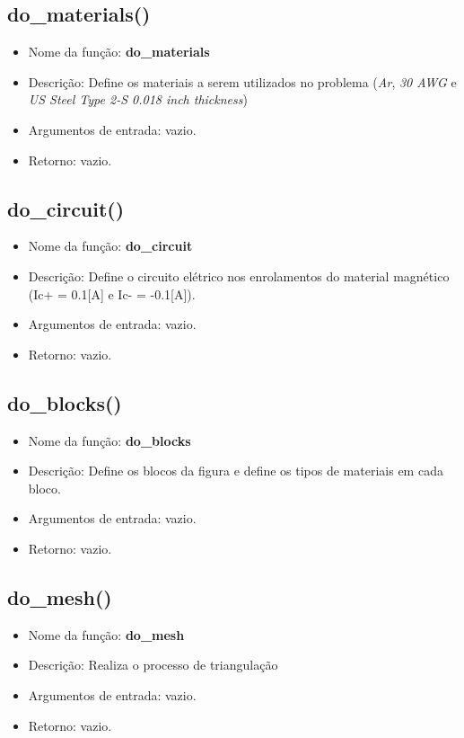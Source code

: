 \subsection*{do\_materials()}
\begin{itemize}
  \item Nome da função: \textbf{do\_materials}
  \item Descrição: Define os materiais a serem utilizados no problema (\textit{Ar}, \textit{30 AWG} e \textit{US Steel Type 2-S 0.018 inch thickness})
  \item Argumentos de entrada: vazio.
  \item Retorno: vazio.
\end{itemize}

\subsection*{do\_circuit()}
\begin{itemize}
  \item Nome da função: \textbf{do\_circuit}
  \item Descrição: Define o circuito elétrico nos enrolamentos do material magnético (Ic+ = 0.1[A] e Ic- = -0.1[A]).
  \item Argumentos de entrada: vazio.
  \item Retorno: vazio.
\end{itemize}

\subsection*{do\_blocks()}
\begin{itemize}
  \item Nome da função: \textbf{do\_blocks}
  \item Descrição: Define os blocos da figura e define os tipos de materiais em cada bloco.
  \item Argumentos de entrada: vazio.
  \item Retorno: vazio.
\end{itemize}

\subsection*{do\_mesh()}
\begin{itemize}
  \item Nome da função: \textbf{do\_mesh}
  \item Descrição: Realiza o processo de triangulação
  \item Argumentos de entrada: vazio.
  \item Retorno: vazio.
\end{itemize}

